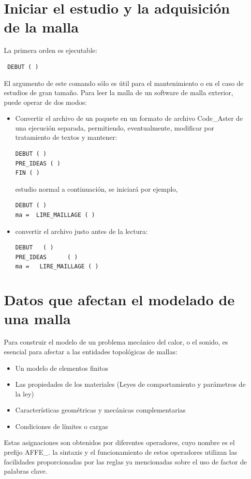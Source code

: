 \documentclass[12pt]{book}
\theoremstyle{definition}
\theoremstyle{remark}
\theoremstyle{plain}
\begin{document}
\section{Iniciar el estudio y la adquisición de la malla}
La primera orden es ejecutable:

\begin{verbatim}
 DEBUT ( )
\end{verbatim} 
El argumento de este comando sólo es útil para el mantenimiento o en el caso de estudios de gran tamaño.
Para leer la malla de un software de malla exterior, puede operar de dos modos:
\begin{itemize}
 \item Convertir el archivo de un paquete en un formato de archivo Code\_Aster  de una ejecución separada,
permitiendo, eventualmente, modificar por tratamiento de textos y mantener:
\begin{verbatim}
DEBUT ( )
PRE_IDEAS ( )
FIN ( )
\end{verbatim} 

estudio normal a continuación, se iniciará por ejemplo,

\begin{verbatim}
DEBUT ( )
ma =  LIRE_MAILLAGE ( )
\end{verbatim} 
 \item convertir el archivo justo antes de la lectura:
\begin{verbatim}
DEBUT   ( )
PRE_IDEAS      ( )
ma =   LIRE_MAILLAGE ( )
\end{verbatim} 
\end{itemize}

\section{Datos que afectan el modelado de una malla}
Para construir el modelo de un problema mecánico del calor, o el sonido, es esencial para afectar a las entidades topológicas de mallas:
\begin{itemize}
 \item Un modelo de elementos finitos
 \item Las propiedades de los materiales (Leyes de comportamiento y parámetros de la ley)
 \item Características geométricas y mecánicas complementarias
 \item Condiciones de límites o cargas
\end{itemize}

Estas asignaciones son obtenidos por diferentes operadores, cuyo nombre es el prefijo AFFE\_. 
la sintaxis y el funcionamiento de estos operadores utilizan las facilidades proporcionadas por las reglas ya mencionadas sobre el uso de factor de palabras clave.
\end{document}
